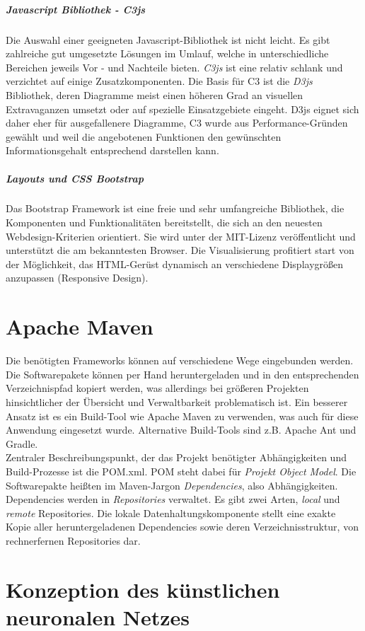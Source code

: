 \subparagraph{Javascript Bibliothek - C3js}
Die Auswahl einer geeigneten Javascript-Bibliothek ist nicht leicht. Es gibt zahlreiche gut umgesetzte Lösungen im Umlauf, welche in unterschiedliche Bereichen jeweils Vor - und Nachteile bieten. \emph{C3js} ist eine relativ schlank und verzichtet auf einige Zusatzkomponenten. Die Basis für C3 ist die \emph{D3js} Bibliothek, deren Diagramme meist einen höheren Grad an visuellen Extravaganzen umsetzt oder auf spezielle Einsatzgebiete eingeht. D3js eignet sich daher eher für ausgefallenere Diagramme, C3 wurde aus Performance-Gründen gewählt und weil die angebotenen Funktionen den gewünschten Informationsgehalt entsprechend darstellen kann.   

\subparagraph{Layouts und CSS Bootstrap}
Das Bootstrap Framework ist eine freie und sehr umfangreiche Bibliothek, die Komponenten und Funktionalitäten bereitstellt, die sich an den neuesten Webdesign-Kriterien orientiert. Sie wird unter der MIT-Lizenz veröffentlicht und unterstützt die am bekanntesten Browser. Die Visualisierung profitiert start von der Möglichkeit, das HTML-Gerüst dynamisch an verschiedene Displaygrößen anzupassen (Responsive Design). 

\section{Apache Maven}
Die benötigten Frameworks können auf verschiedene Wege eingebunden werden. Die Softwarepakete können per Hand heruntergeladen und in den entsprechenden Verzeichnispfad kopiert werden, was allerdings bei größeren Projekten hinsichtlicher der Übersicht und Verwaltbarkeit problematisch ist. Ein besserer Ansatz ist es ein Build-Tool wie Apache Maven zu verwenden, was auch für diese Anwendung eingesetzt wurde. Alternative Build-Tools sind z.B. Apache Ant und Gradle.\\
Zentraler Beschreibungspunkt, der das Projekt benötigter Abhängigkeiten und Build-Prozesse ist die POM.xml. POM steht dabei für \emph{Projekt Object Model}.
Die Softwarepakte heißten im Maven-Jargon \emph{Dependencies}, also Abhängigkeiten. Dependencies werden in \emph{Repositories} verwaltet. Es gibt zwei Arten, \emph{local} und \emph{remote} Repositories.   
Die lokale Datenhaltungskomponente stellt eine exakte Kopie aller heruntergeladenen Dependencies sowie deren Verzeichnisstruktur, von rechnerfernen Repositories dar. 


\section{Konzeption des künstlichen neuronalen Netzes}
\label{section:Konzeption des künstlichen neuronalen Netzes}

